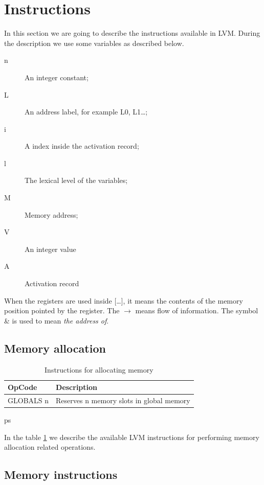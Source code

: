 \documentclass[a4paper, 11pt]{report}
\newcommand{\arrow}{\ensuremath{\rightarrow}}
\begin{document}
\section{Instructions}

In this section we are going to describe the instructions available in LVM. During the
description we use some variables as described below.

\begin{description}
\item[n] An integer constant;
\item[L] An address label, for example L0, L1\dots;
\item[i] A index inside the activation record;
\item[l] The lexical level of the variables;
\item[M] Memory address;
\item[V] An integer value
\item[A] Activation record
\end{description} 

When the registers are used inside [\dots], it means the contents of the
memory position pointed by the register. The \arrow{} means flow of information.
The symbol \& is used to mean \emph{the address of}.

\subsection{Memory allocation}

\begin{table}[htb]
 \begin{tabular}{|l|l|}
  \hline
  OpCode & Description\\
  \hline\hline
  GLOBALS n & Reserves n memory slots in global memory\\
  \hline
 \end{tabular}
 \caption{Instructions for allocating memory}
ps \label{tbl:memalloc}
\end{table}

In the table \ref{tbl:memalloc} we describe the available LVM instructions for performing memory
allocation related operations.

\subsection{Memory instructions}
\end{document}
